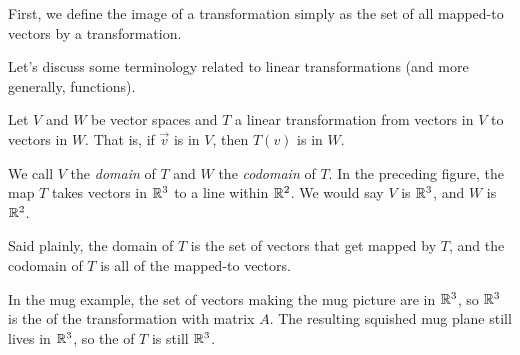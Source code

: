 \documentclass{ximera}
\begin{document}
\begin{center}
\end{center}

First, we define the image of a transformation simply as the set of all mapped-to vectors by a transformation.

Let's discuss some terminology related to linear transformations (and more generally, functions). 

\begin{definition}
  Let $V$ and $W$ be vector spaces and $T$ a linear transformation from vectors in $V$ to vectors in $W$. That is, if $\vec{v}$ is in $V$, then $T(v)$ is in $W$.

  \begin{center}
    \end{center}

  We call $V$ the \emph{domain} of $T$ and $W$ the \emph{codomain} of $T$. In the preceding figure, the map $T$ takes vectors in $\mathbb{R}^3$ to a line within $\mathbb{R}^2$. We would say $V$ is $\mathbb{R}^3$, and $W$ is $\mathbb{R}^2$.
\end{definition}

Said plainly, the domain of $T$ is the set of vectors that get mapped by $T$, and the codomain of $T$ is all of the mapped-to vectors. 

In the mug example, the set of vectors making the mug picture are in $\mathbb{R}^3$, so $\mathbb{R}^3$ is the  of the transformation with matrix $A$. The resulting squished mug plane still lives in $\mathbb{R}^3$, so the  of $T$ is still $\mathbb{R}^3$. 
\end{document}
